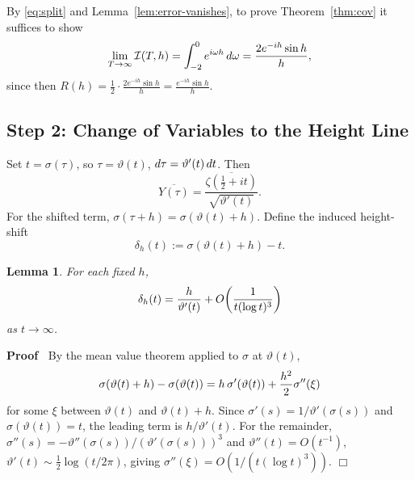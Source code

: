 \documentclass{article}
\newcommand{\assign}{:=}
\newenvironment{proof}{\noindent\textbf{Proof\ }}{\hspace*{\fill}$\Box$\medskip}
\newtheorem{lemma}{Lemma}
\begin{document}
By \eqref{eq:split} and Lemma~\ref{lem:error-vanishes}, to prove
Theorem~\ref{thm:cov} it suffices to show
\begin{equation}
  \label{eq:suffices} \lim_{T \to \infty} \mathcal{I} (T, h) = \int_{- 2}^0
  e^{i \omega h}  \hspace{0.17em} d \omega = \frac{2 e^{- ih} \sin h}{h},
\end{equation}
since then $R (h) = \frac{1}{2} \cdot \frac{2 e^{- ih} \sin h}{h} = \frac{e^{-
ih} \sin h}{h}$.

\subsection*{Step 2: Change of Variables to the Height Line}

Set $t = \sigma (\tau)$, so $\tau = \vartheta (t)$, $d \tau = \vartheta' (t) 
\hspace{0.17em} dt$. Then
\[ \overline{Y (\tau)} = \frac{\overline{\zeta (\tfrac{1}{2} +
   it)}}{\sqrt{\vartheta' (t)}} . \]
For the shifted term, $\sigma (\tau + h) = \sigma (\vartheta (t) + h)$. Define
the induced height-shift
\begin{equation}
  \label{eq:delta-def} \delta_h (t) \assign \sigma (\vartheta (t) + h) - t.
\end{equation}
\begin{lemma}
  \label{lem:delta}For each fixed $h$,
  \[ \delta_h (t) = \frac{h}{\vartheta' (t)} + O \hspace{-0.17em} \left(
     \frac{1}{t (\log t)^3} \right) \]
  as $t \to \infty$.
\end{lemma}

\begin{proof}
  By the mean value theorem applied to $\sigma$ at $\vartheta (t)$,
  \[ \sigma (\vartheta (t) + h) - \sigma (\vartheta (t)) = h \hspace{0.17em}
     \sigma' (\vartheta (t)) + \frac{h^2}{2} \sigma'' (\xi) \]
  for some $\xi$ between $\vartheta (t)$ and $\vartheta (t) + h$. Since
  $\sigma' (s) = 1 / \vartheta' (\sigma (s))$ and $\sigma (\vartheta (t)) =
  t$, the leading term is $h / \vartheta' (t)$. For the remainder, $\sigma''
  (s) = - \vartheta'' (\sigma (s)) / (\vartheta' (\sigma (s)))^3$ and
  $\vartheta'' (t) = O (t^{- 1})$, $\vartheta' (t) \sim \frac{1}{2} \log (t /
  2 \pi)$, giving $\sigma'' (\xi) = O (1 / (t (\log t)^3))$.
\end{proof}
\end{document}
